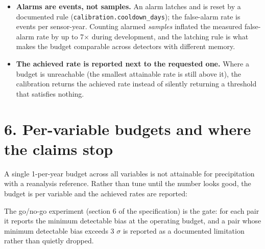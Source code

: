 \documentclass[10pt,a4paper]{article}
\begin{document}
\begin{itemize}
\item \textbf{Alarms are events, not samples.} An alarm latches and is reset by a
documented rule (\texttt{calibration.cooldown\_\allowbreak{}days}); the false-\allowbreak{}alarm rate is events per sensor-\allowbreak{}year. Counting alarmed \emph{samples} inflated the measured false-\allowbreak{}alarm rate by up to 7$\times$ during development, and the latching rule is what makes the budget comparable across detectors with different memory.

\item \textbf{The achieved rate is reported next to the requested one.} Where a budget is
unreachable (the smallest attainable rate is still above it), the calibration returns the achieved rate instead of silently returning a threshold that satisfies nothing.

\end{itemize}

\section*{6. Per-\allowbreak{}variable budgets and where the claims stop}
A single 1-\allowbreak{}per-\allowbreak{}year budget across all variables is not attainable for precipitation with a reanalysis reference. Rather than tune until the number looks good, the budget is per variable and the achieved rates are reported:

\begin{center}
\end{center}

The go/\allowbreak{}no-\allowbreak{}go experiment (section 6 of the specification) is the gate: for each pair it reports the minimum detectable bias at the operating budget, and a pair whose minimum detectable bias exceeds 3 $\sigma$ is reported as a documented limitation rather than quietly dropped.
\end{document}
